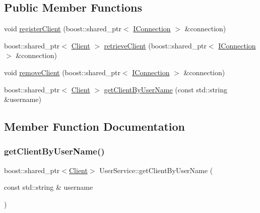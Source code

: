 \subsection*{Public Member Functions}
\begin{DoxyCompactItemize}
\item 
void \mbox{\hyperlink{classUserService_a7fde1ac30d6bc9e9177def82097cd73b}{register\+Client}} (boost\+::shared\+\_\+ptr$<$ \mbox{\hyperlink{classIConnection}{I\+Connection}} $>$ \&connection)
\item 
boost\+::shared\+\_\+ptr$<$ \mbox{\hyperlink{classClient}{Client}} $>$ \mbox{\hyperlink{classUserService_a2f79f2e036977fd16ae7ca14b1017530}{retrieve\+Client}} (boost\+::shared\+\_\+ptr$<$ \mbox{\hyperlink{classIConnection}{I\+Connection}} $>$ \&connection)
\item 
void \mbox{\hyperlink{classUserService_af919fd2cca398408c61081aaadb26e88}{remove\+Client}} (boost\+::shared\+\_\+ptr$<$ \mbox{\hyperlink{classIConnection}{I\+Connection}} $>$ \&connection)
\item 
boost\+::shared\+\_\+ptr$<$ \mbox{\hyperlink{classClient}{Client}} $>$ \mbox{\hyperlink{classUserService_a8eaccab3dc50dd0b69c917b906926f95}{get\+Client\+By\+User\+Name}} (const std\+::string \&username)
\end{DoxyCompactItemize}


\subsection{Member Function Documentation}
\mbox{\label{classUserService_a8eaccab3dc50dd0b69c917b906926f95}} 
\subsubsection{\texorpdfstring{get\+Client\+By\+User\+Name()}{getClientByUserName()}}
{\footnotesize\ttfamily boost\+::shared\+\_\+ptr$<$\mbox{\hyperlink{classClient}{Client}}$>$ User\+Service\+::get\+Client\+By\+User\+Name (\begin{DoxyParamCaption}\item[{const std\+::string \&}]{username }\end{DoxyParamCaption})\hspace{0.3cm}{\ttfamily [inline]}}


